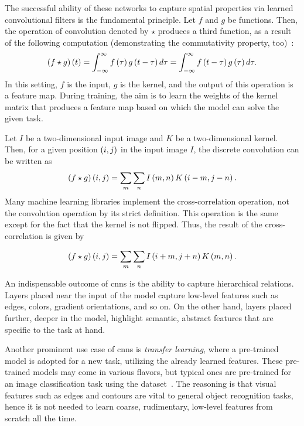 The successful ability of these networks to capture spatial properties via learned convolutional filters is the fundamental principle. Let $f$ and $g$ be functions. Then, the operation of convolution denoted by $\star$ produces a third function, as a result of the following computation (demonstrating the commutativity property, too)~\cite{goodfellow2016dl}:
\begin{equation}
    \label{eq:ConvolutionContinuous}
    {\left( {f \star g} \right)} \left( t \right) =
    \int_{-\infty}^{\infty}
    {f} \left( \tau \right)
    {g} \left( t - \tau \right)
    d\tau =
    \int_{-\infty}^{\infty}
    {f} \left( t -\tau \right)
    {g} \left( \tau \right)
    d\tau.
\end{equation}
In this setting, $f$ is the input, $g$ is the kernel, and the output of this operation is a feature map. During training, the aim is to learn the weights of the kernel matrix that produces a feature map based on which the model can solve the given task.

Let $I$ be a two-dimensional input image and $K$ be a two-dimensional kernel. Then, for a given position $\left( {i, j} \right)$ in the input image $I$, the discrete convolution can be written as
\begin{equation}
    \label{eq:ConvolutionDiscrete}
    {\left( {f \star g} \right)} \left( i, j \right) =
    \sum_{m}
    \sum_{n}
    {I} \left( m, n \right)
    {K} \left( i - m, j - n \right).
\end{equation}
Many machine learning libraries implement the cross-correlation operation, not the convolution operation by its strict definition. This operation is the same except for the fact that the kernel is not flipped. Thus, the result of the cross-correlation is given by

\begin{equation}
    \label{eq:CrossCorrelation}
    {\left( {f \star g} \right)} \left( i, j \right) =
    \sum_{m}
    \sum_{n}
    {I} \left( i + m, j + n \right)
    {K} \left( m, n \right).
\end{equation}

An indispensable outcome of \glspl{cnn} is the ability to capture hierarchical relations. Layers placed near the input of the model capture low-level features such as edges, colors, gradient orientations, and so on. On the other hand, layers placed further, deeper in the model, highlight semantic, abstract features that are specific to the task at hand.

Another prominent use case of \glspl{cnn} is \emph{transfer learning}, where a pre-trained model is adopted for a new task, utilizing the already learned features. These pre-trained models may come in various flavors, but typical ones are pre-trained for an image classification task using the  dataset~\cite{deng2009imagenet}. The reasoning is that visual features such as edges and contours are vital to general object recognition tasks, hence it is not needed to learn coarse, rudimentary, low-level features from scratch all the time.
